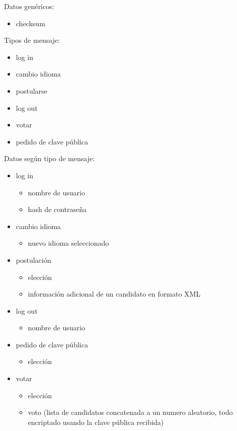 Datos genéricos:
\begin{itemize}
 \item checksum
\end{itemize}

Tipos de mensaje:
\begin{itemize}
 \item log in 
 \item cambio idioma
 \item postularse
 \item log out
 \item votar
 \item pedido de clave pública
\end{itemize}

Datos según tipo de mensaje:
\begin{itemize}
 \item log in


  \begin{itemize}
    \item nombre de usuario
    \item hash de contraseña
  \end{itemize}
  \item cambio idioma
  

  \begin{itemize}
    \item nuevo idioma seleccionado
  \end{itemize}
  \item postulación
  
  \begin{itemize}
    \item elección
    \item información adicional de un candidato en formato XML
  \end{itemize}
  \item log out
  
  \begin{itemize}
    \item nombre de usuario
  \end{itemize}
  \item pedido de clave pública
  
  \begin{itemize}
    \item elección
  \end{itemize}
  \item votar
  
  \begin{itemize}
    \item elección
    \item voto (lista de candidatos concatenada a un 
			numero aleatorio, todo encriptado usando la clave pública recibida)
  \end{itemize}
\end{itemize}



